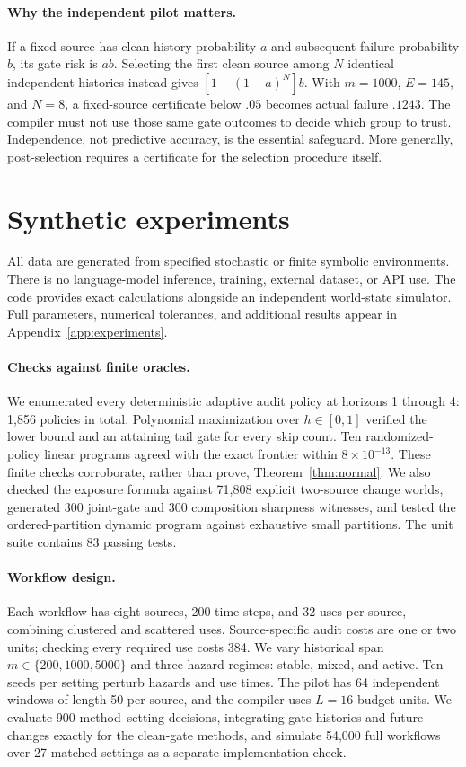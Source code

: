 \documentclass{article}
\newcommand{\1}{\mathbf 1}
\begin{document}
\paragraph{Why the independent pilot matters.}
If a fixed source has clean-history probability $a$ and subsequent failure probability $b$, its gate risk is $ab$. Selecting the first clean source among $N$ identical independent histories instead gives $[1-(1-a)^N]b$. With $m=1000$, $E=145$, and $N=8$, a fixed-source certificate below $.05$ becomes actual failure $.1243$. The compiler must not use those same gate outcomes to decide which group to trust. Independence, not predictive accuracy, is the essential safeguard. More generally, post-selection requires a certificate for the selection procedure itself.

\section{Synthetic experiments}\label{sec:exp}
All data are generated from specified stochastic or finite symbolic environments. There is no language-model inference, training, external dataset, or API use. The code provides exact calculations alongside an independent world-state simulator. Full parameters, numerical tolerances, and additional results appear in Appendix~\ref{app:experiments}.

\paragraph{Checks against finite oracles.}
We enumerated every deterministic adaptive audit policy at horizons 1 through 4: 1,856 policies in total. Polynomial maximization over $h\in[0,1]$ verified the lower bound and an attaining tail gate for every skip count. Ten randomized-policy linear programs agreed with the exact frontier within $8\times10^{-13}$. These finite checks corroborate, rather than prove, Theorem~\ref{thm:normal}. We also checked the exposure formula against 71,808 explicit two-source change worlds, generated 300 joint-gate and 300 composition sharpness witnesses, and tested the ordered-partition dynamic program against exhaustive small partitions. The unit suite contains 83 passing tests.

\paragraph{Workflow design.}
Each workflow has eight sources, 200 time steps, and 32 uses per source, combining clustered and scattered uses. Source-specific audit costs are one or two units; checking every required use costs 384. We vary historical span $m\in\{200,1000,5000\}$ and three hazard regimes: stable, mixed, and active. Ten seeds per setting perturb hazards and use times. The pilot has 64 independent windows of length 50 per source, and the compiler uses $L=16$ budget units. We evaluate 900 method--setting decisions, integrating gate histories and future changes exactly for the clean-gate methods, and simulate 54,000 full workflows over 27 matched settings as a separate implementation check.
\end{document}
